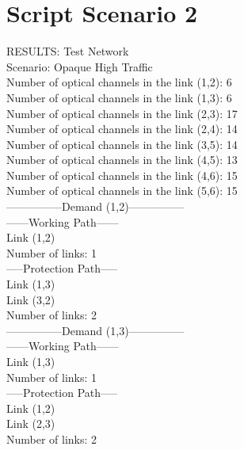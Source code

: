 \clearpage

\section{Script Scenario 2}

\qquad RESULTS: Test Network \\

\quad Scenario: Opaque High Traffic \\

Number of optical channels in the link (1,2): 6 \\
\quad Number of optical channels in the link (1,3): 6 \\
\quad Number of optical channels in the link (2,3): 17 \\
\quad Number of optical channels in the link (2,4): 14 \\
\quad Number of optical channels in the link (3,5): 14 \\
\quad Number of optical channels in the link (4,5): 13 \\
\quad Number of optical channels in the link (4,6): 15 \\
\quad Number of optical channels in the link (5,6): 15 \\


---------------Demand (1,2)--------------- \\

------Working Path------ \\
Link  (1,2) \\
Number of links: 1 \\

-----Protection Path----- \\
Link  (1,3) \\
Link  (3,2) \\
Number of links: 2 \\


---------------Demand (1,3)--------------- \\

------Working Path------ \\
Link  (1,3) \\
Number of links: 1 \\

-----Protection Path----- \\
Link  (1,2) \\
Link  (2,3) \\
Number of links: 2 \\


